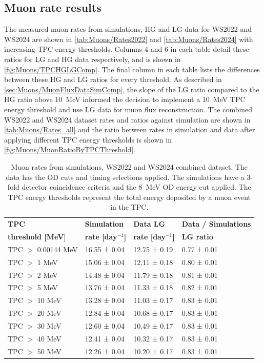\subsection{Muon rate results}\label{sec:Muons/MuonRateResults}
The measured muon rates from simulations, HG and LG data for WS2022 and WS2024 are shown in \autoref{tab:Muons/Rates2022} and \autoref{tab:Muons/Rates2024} with increasing TPC energy thresholds. Columns 4 and 6 in each table detail these ratios for LG and HG data respectively, and is shown in \autoref{fig:Muons/TPCHGLGComp}. The final column in each table lists the differences between these HG and LG ratios for every threshold. As described in \autoref{sec:Muons/MuonFluxDataSimComp}, the slope of the LG ratio compared to the HG ratio above 10~MeV informed the decision to implement a 10~MeV TPC energy threshold and use LG data for muon flux reconstruction. The combined WS2022 and WS2024 dataset rates and ratios against simulation are shown in \autoref{tab:Muons/Rates_all} and the ratio between rates in simulation and data after applying different TPC energy thresholds is shown in \autoref{fig:Muons/MuonRatioByTPCThreshold}.

\begin{table}[h!]
    \centering
    \caption[Muon rates from simulations, WS2022 and WS2024 combined dataset.]{Muon rates from simulations, WS2022 and WS2024 combined dataset. The data has the OD cuts and timing selections applied. The simulations have a 3-fold detector coincidence criteria and the 8~MeV OD energy cut applied. The TPC energy thresholds represent the total energy deposited by a muon event in the TPC.}
    \begin{tabular}{llll}
    \hline\hline
    \textbf{TPC} & \textbf{Simulation} & \textbf{Data LG} & \textbf{Data / Simulations} \\
    \textbf{threshold [MeV]} & \textbf{rate [day$^{-1}$]} & \textbf{rate [day$^{-1}$]} & \textbf{LG ratio}\\
    \hline
    TPC $>$ 0.00144 MeV & 16.55 ± 0.04 & 12.75 ± 0.19 & 0.77 ± 0.01 \\ 
    TPC $>$ 1 MeV & 15.06 ± 0.04 & 12.11 ± 0.18 & 0.80 ± 0.01\\ 
    TPC $>$ 2 MeV & 14.48 ± 0.04 & 11.79 ± 0.18 & 0.81 ± 0.01 \\ 
    TPC $>$ 5 MeV & 13.76 ± 0.04 & 11.33 ± 0.18 & 0.82 ± 0.01  \\ 
    TPC $>$ 10 MeV & 13.28 ± 0.04 & 11.03 ± 0.17 & 0.83 ± 0.01 \\ 
    TPC $>$ 20 MeV & 12.84 ± 0.04 & 10.68 ± 0.17 & 0.83 ± 0.01  \\ 
    TPC $>$ 30 MeV & 12.60 ± 0.04 & 10.49 ± 0.17 & 0.83 ± 0.01  \\ 
    TPC $>$ 40 MeV & 12.41 ± 0.04 & 10.32 ± 0.17 & 0.83 ± 0.01  \\ 
    TPC $>$ 50 MeV & 12.26 ± 0.04 & 10.20 ± 0.17 & 0.83 ± 0.01 \\
    \hline\hline
    \end{tabular}
    \label{tab:Muons/Rates_all}
\end{table}

